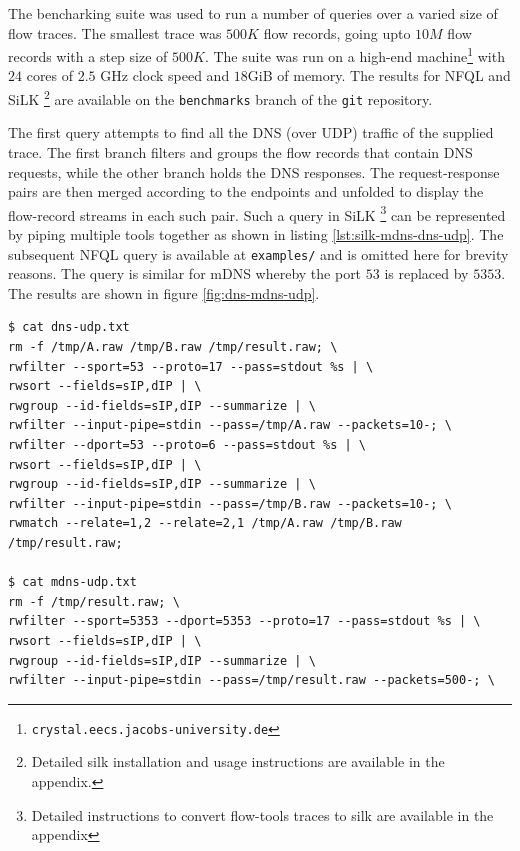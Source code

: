 The bencharking suite was used to run a number of queries over a varied size
of flow traces. The smallest trace was $500K$ flow records, going upto $10M$
flow records with a step size of $500K$. The suite was run on a high-end
machine\footnote{\texttt{crystal.eecs.jacobs-university.de}} with $24$ cores
of $2.5$ GHz clock speed and $18$GiB of memory. The results for NFQL and SiLK
\footnote{Detailed silk installation and usage instructions are available in
the appendix.} \cite{SiLK} are available on the \texttt{benchmarks} branch of
the \texttt{git} repository.

The first query attempts to find all the DNS (over UDP) traffic of the
supplied trace. The first branch filters and groups the flow records that
contain DNS requests, while the other branch holds the DNS responses. The
request-response pairs are then merged according to the endpoints and unfolded
to  display the flow-record
streams in each such pair. Such a query in SiLK \footnote{Detailed
instructions to convert flow-tools traces to silk are available in the
appendix} can be represented by piping multiple tools together as shown in
listing \ref{lst:silk-mdns-dns-udp}. The subsequent NFQL query is available at
\texttt{examples/} and is omitted here for brevity reasons. The query is
similar for mDNS whereby the port $53$ is replaced by $5353$. The results are
shown in figure \ref{fig:dns-mdns-udp}.

\begin{lstlisting}
$ cat dns-udp.txt
rm -f /tmp/A.raw /tmp/B.raw /tmp/result.raw; \
rwfilter --sport=53 --proto=17 --pass=stdout %s | \
rwsort --fields=sIP,dIP | \
rwgroup --id-fields=sIP,dIP --summarize | \
rwfilter --input-pipe=stdin --pass=/tmp/A.raw --packets=10-; \
rwfilter --dport=53 --proto=6 --pass=stdout %s | \
rwsort --fields=sIP,dIP | \
rwgroup --id-fields=sIP,dIP --summarize | \
rwfilter --input-pipe=stdin --pass=/tmp/B.raw --packets=10-; \
rwmatch --relate=1,2 --relate=2,1 /tmp/A.raw /tmp/B.raw /tmp/result.raw;

$ cat mdns-udp.txt
rm -f /tmp/result.raw; \
rwfilter --sport=5353 --dport=5353 --proto=17 --pass=stdout %s | \
rwsort --fields=sIP,dIP | \
rwgroup --id-fields=sIP,dIP --summarize | \
rwfilter --input-pipe=stdin --pass=/tmp/result.raw --packets=500-; \
\end{lstlisting}

